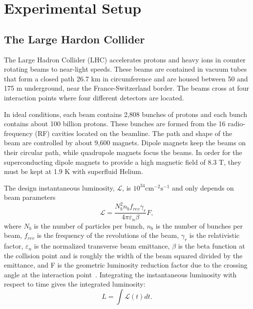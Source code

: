 \chapter{Experimental Setup}
\label{ch:ExpSetup}

\section{The Large Hardon Collider}
The Large Hadron Collider (LHC) accelerates protons and heavy ions in counter rotating beams to near-light speeds. These beams are contained in vacuum tubes that form a closed path 26.7 km in circumference and are housed between 50 and 175 m underground, near the France-Switzerland border. The beams cross at four interaction points where four different detectors are located. 

In ideal conditions, each beam contains 2,808 bunches of protons and each bunch contains about 100 billion protons. These bunches are formed from the 16 radio-frequency (RF) cavities located on the beamline. The path and shape of the beam are controlled by about 9,600 magnets. Dipole magnets keep the beams on their circular path, while quadrupole magnets focus the beams. In order for the superconducting dipole magnets to provide a high magnetic field of 8.3 T, they must be kept at 1.9 K with superfluid Helium. 

The design instantaneous luminosity, $\mathcal{L}$, is $10^{34}\mathrm{cm}^{-2}\mathrm{s}^{-1}$ and only depends on beam parameters
\begin{equation}
\mathcal{L} = \frac{N_{b}^{2}n_{b}f_{rev}\gamma_{r}}{4\pi\varepsilon_{n}\beta}F,
\end{equation}
where $N_{b}$ is the number of particles per bunch, $n_{b}$ is the number of bunches per beam, $f_{rev}$ is the frequency of the revolutions of the beam, $\gamma_{r}$ is the relativistic factor, $\varepsilon_{n}$ is the normalized transverse beam emittance, $\beta$ is the beta function at the collision point and is roughly the width of the beam squared divided by the emittance, and F is the geometric luminosity reduction factor due to the crossing angle at the interaction point~\cite{LHCMachine}. Integrating the instantaneous luminosity with respect to time gives the integrated luminosity:
\begin{equation}
L = \int\mathcal{L}(t)dt.
\end{equation}

